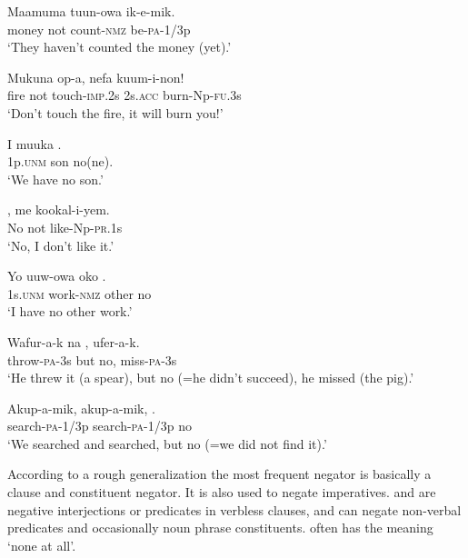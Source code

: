 \ea%
\label{ex:3:x654}
\gll Maamuma  tuun-owa ik-e-mik. \\
money not count-\textsc{nmz} be-\textsc{pa}-1/3p\\
\glt`They haven't counted the money (yet).'
\z

\ea%
\label{ex:3:x1112}
\gll Mukuna  op-a, nefa kuum-i-non! \\
fire not touch-\textsc{imp}.2s 2s.\textsc{acc} burn-Np-\textsc{fu}.3s\\
\glt`Don't touch the fire, it will burn you!'
\z

\ea%
\label{ex:3:x655}
\gll I muuka . \\
1p.\textsc{unm} son no(ne).\\
\glt`We have no son.'
\z

\ea%
\label{ex:3:x707}
\gll {}, me kookal-i-yem. \\
No not like-Np-\textsc{pr}.1s \\
\glt`No, I don't like it.'
\z

\ea%
\label{ex:3:x1212}
\gll Yo uuw-owa oko . \\
1s.\textsc{unm} work-\textsc{nmz} other no\\
\glt`I have no other work.'
\z

\ea%
\label{ex:3:x705}
\gll Wafur-a-k na , ufer-a-k. \\
throw-\textsc{pa}-3s but no, miss-\textsc{pa}-3s\\
\glt`He threw it (a spear), but no (=he didn't succeed), he missed (the pig).'
\z

\ea%
\label{ex:3:x1111}
\gll Akup-a-mik, akup-a-mik, . \\
search-\textsc{pa}-1/3p search-\textsc{pa}-1/3p no\\
\glt`We searched and searched, but no (=we did not find it).'
\z

According to a rough generalization the most frequent negator  is basically a clause and constituent negator. It is also used to negate imperatives.  and  are negative interjections or predicates in verbless clauses, and  can negate non-verbal predicates and occasionally noun phrase constituents.  often has the meaning `none at all'.

